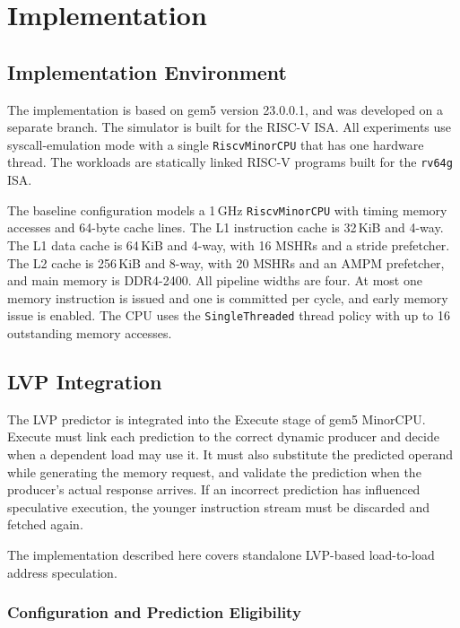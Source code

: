 \section{Implementation}

\subsection{Implementation Environment}
\label{sec:impl-env}

The implementation is based on gem5 version 23.0.0.1, and was developed on a separate branch. The simulator is built for the RISC-V ISA. All experiments use
syscall-emulation mode with a single \texttt{RiscvMinorCPU} that has
one hardware thread. The workloads are statically linked
RISC-V programs built for the \texttt{rv64g} ISA.

The baseline configuration models a 1\,GHz \texttt{RiscvMinorCPU}
with timing memory accesses and 64-byte cache lines. The L1
instruction cache is 32\,KiB and 4-way. The L1 data cache is 64\,KiB
and 4-way, with 16 MSHRs and a stride prefetcher. The L2 cache is
256\,KiB and 8-way, with 20 MSHRs and an AMPM prefetcher, and main
memory is DDR4-2400. All pipeline widths are four. At most one memory
instruction is issued and one is committed per cycle, and early memory
issue is enabled. The CPU uses the \texttt{SingleThreaded} thread
policy with up to 16 outstanding memory accesses.

\subsection{LVP Integration}
\label{sec:lvp-integration}

The LVP predictor is integrated into the Execute stage of gem5
MinorCPU. Execute
must link each prediction to the correct dynamic producer and decide
when a dependent load may use it. It must also substitute the
predicted operand while generating the memory request, and validate
the prediction when the producer's actual response arrives. If an
incorrect prediction has influenced speculative execution, the
younger instruction stream must be discarded and fetched again.

The implementation described here covers standalone LVP-based
load-to-load address speculation.

\subsubsection{Configuration and Prediction Eligibility}

